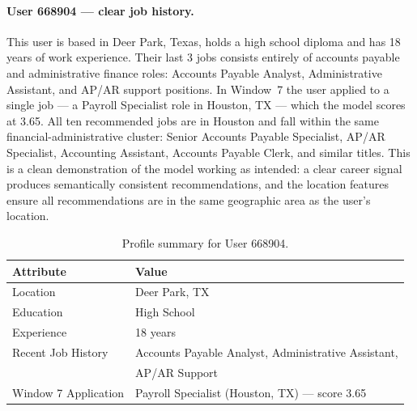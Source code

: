 \paragraph{User 668904 — clear job history.}
This user is based in Deer Park, Texas, holds a high school diploma and has 18 years of work experience. Their last 3 jobs consists entirely of accounts payable and administrative finance roles: Accounts Payable Analyst, Administrative Assistant, and AP/AR support positions. In Window~7 the user applied to a single job — a Payroll Specialist role in Houston, TX — which the model scores at 3.65. All ten recommended jobs are in Houston and fall within the same financial-administrative cluster: Senior Accounts Payable Specialist, AP/AR Specialist, Accounting Assistant, Accounts Payable Clerk, and similar titles. This is a clean demonstration of the model working as intended: a clear career signal produces semantically consistent recommendations, and the location features ensure all recommendations are in the same geographic area as the user's location. 

\begin{table}[H]
    \centering
    \caption{Profile summary for User 668904.}
    \label{tab:user668904_profile}
    \small
    \begin{tabular}{ll}
        \toprule
        \textbf{Attribute} & \textbf{Value} \\
        \midrule
        Location            & Deer Park, TX \\
        Education           & High School \\
        Experience          & 18 years \\
        Recent Job History  & Accounts Payable Analyst, Administrative Assistant, \\
                            & AP/AR Support\\
        Window 7 Application & Payroll Specialist (Houston, TX) — score 3.65 \\
        \bottomrule
    \end{tabular}
\end{table}
 
